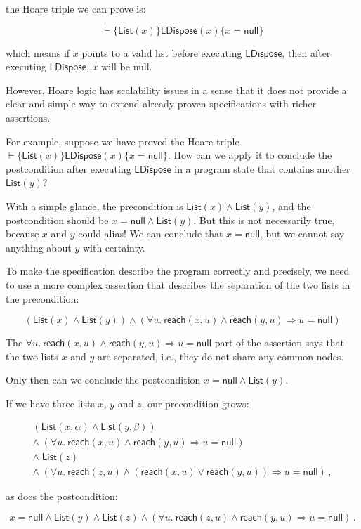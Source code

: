 \documentclass[11pt]{article}
\newcommand{\List}{\mathsf{List}}
\newcommand{\LDispose}{\mathsf{LDispose}}
\newcommand{\reach}{\mathsf{reach}}
\newcommand{\Null}{\mathsf{null}}
\begin{document}
the Hoare triple we can prove is:

$$
\vdash \{ \List(x) \} \LDispose(x) \{ x = \Null \}
$$

which means if $x$ points to a valid list before executing $\LDispose$, then
after executing $\LDispose$, $x$ will be null.

However, Hoare logic has scalability issues in a sense that it does not provide
a clear and simple way to extend already proven specifications with richer assertions.

For example, suppose we have proved the Hoare triple $\vdash \{ \List(x) \} \LDispose(x) \{ x = \Null \}$. 
How can we apply it to conclude the postcondition after executing $\LDispose$ in a program state that contains another $\List(y)$?

With a simple glance, the precondition is $\List(x) \land \List(y)$, and the
postcondition should be $x = \Null \land \List(y)$.
But this is not necessarily true, because $x$ and $y$ could alias!
We can conclude that $x = \Null$, but we cannot say anything about $y$ with certainty.

To make the specification describe the program correctly and precisely, we need
to use a more complex assertion that describes the separation of the two lists
in the precondition:

$$
(\List(x) \land \List(y)) \land
(\forall u.\ \reach(x, u) \land \reach(y, u) \Rightarrow u = \Null)
$$

The $\forall u.\ \reach(x, u) \land \reach(y, u) \Rightarrow u = \Null$ part of
the assertion says that the two lists $x$ and $y$ are separated, i.e., they do
not share any common nodes.

Only then can we conclude the postcondition $x = \Null \land \List(y)$.

If we have three lists $x$, $y$ and $z$, our precondition grows:

$$
\begin{array}{l}
(\List(x, \alpha) \land \List(y, \beta)) \\
\land\;(\forall u.\ \reach(x, u) \land \reach(y, u) \Rightarrow u = \Null) \\
\land\;\List(z) \\
\land\;(\forall u.\ \reach(z, u) \land (\reach(x, u) \lor \reach(y, u))
  \Rightarrow u = \Null)\,,
\end{array}
$$

as does the postcondition:

$$
x = \Null \land \List(y) \land \List(z) \land 
(\forall u.\ \reach(z, u) \land \reach(y, u) \Rightarrow u = \Null)\, .
$$
\end{document}
